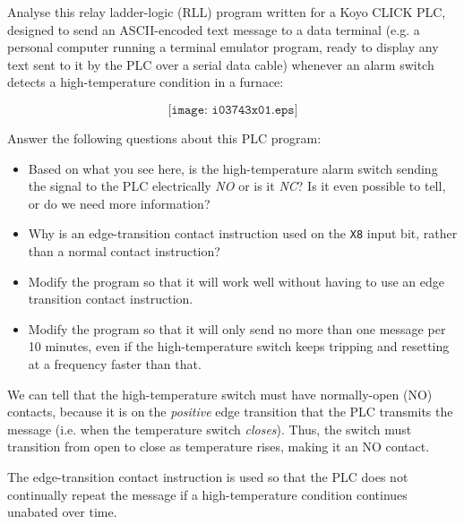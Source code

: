 

Analyse this relay ladder-logic (RLL) program written for a Koyo CLICK PLC, designed to send an ASCII-encoded text message to a data terminal (e.g. a personal computer running a terminal emulator program, ready to display any text sent to it by the PLC over a serial data cable) whenever an alarm switch detects a high-temperature condition in a furnace:

$$\texttt{[image: i03743x01.eps]}$$

Answer the following questions about this PLC program:

\begin{itemize}
\item{} Based on what you see here, is the high-temperature alarm switch sending the signal to the PLC electrically {\it NO} or is it {\it NC}?  Is it even possible to tell, or do we need more information?
\vskip 10pt
\item{} Why is an edge-transition contact instruction used on the {\tt X8} input bit, rather than a normal contact instruction?
\vskip 10pt
\item{} Modify the program so that it will work well without having to use an edge transition contact instruction.
\vskip 10pt
\item{} Modify the program so that it will only send no more than one message per 10 minutes, even if the high-temperature switch keeps tripping and resetting at a frequency faster than that.
\end{itemize}







We can tell that the high-temperature switch must have normally-open (NO) contacts, because it is on the {\it positive} edge transition that the PLC transmits the message (i.e. when the temperature switch {\it closes}).  Thus, the switch must transition from open to close as temperature rises, making it an NO contact.

\vskip 10pt

The edge-transition contact instruction is used so that the PLC does not continually repeat the message if a high-temperature condition continues unabated over time.

